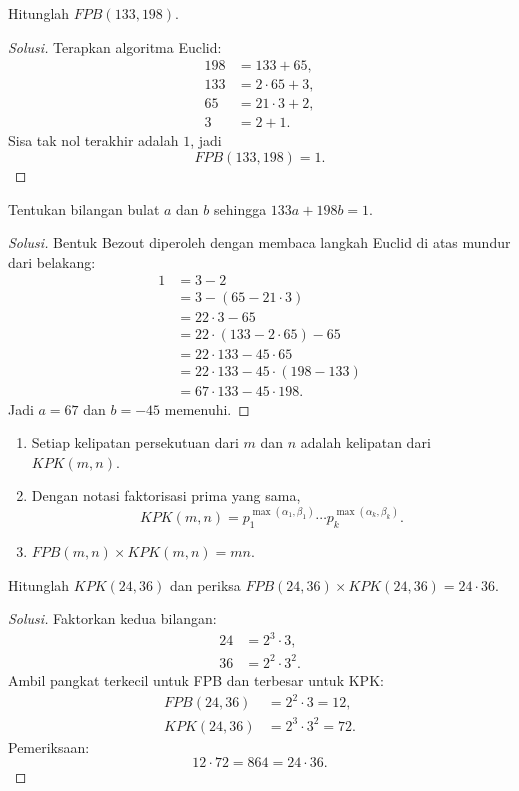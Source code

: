 \documentclass[12pt]{scrartcl}
\begin{document}
\begin{example}
Hitunglah $FPB(133, 198)$.
\end{example}
\begin{proof}[Solusi]
Terapkan algoritma Euclid:
\begin{align*}
198 &= 133 + 65, \\
133 &= 2 \cdot 65 + 3, \\
65 &= 21 \cdot 3 + 2, \\
3 &= 2 + 1.
\end{align*}
Sisa tak nol terakhir adalah $1$, jadi
\[ FPB(133, 198) = 1. \]
\end{proof}

\begin{example}
Tentukan bilangan bulat $a$ dan $b$ sehingga $133a + 198b = 1$.
\end{example}
\begin{proof}[Solusi]
Bentuk Bezout diperoleh dengan membaca langkah Euclid di atas mundur dari belakang:
\begin{align*}
1 &= 3 - 2 \\
&= 3 - (65 - 21 \cdot 3) \\
&= 22 \cdot 3 - 65 \\
&= 22 \cdot (133 - 2 \cdot 65) - 65 \\
&= 22 \cdot 133 - 45 \cdot 65 \\
&= 22 \cdot 133 - 45 \cdot (198 - 133) \\
&= 67 \cdot 133 - 45 \cdot 198.
\end{align*}
Jadi $a = 67$ dan $b = -45$ memenuhi.
\end{proof}

\begin{fact}
\begin{enumerate}
    \item Setiap kelipatan persekutuan dari $m$ dan $n$ adalah kelipatan dari $KPK(m, n)$.
    \item Dengan notasi faktorisasi prima yang sama,
    \[ KPK(m, n) = p_1^{\max(\alpha_1, \beta_1)} \cdots p_k^{\max(\alpha_k, \beta_k)}. \]
    \item $FPB(m, n) \times KPK(m, n) = mn$.
\end{enumerate}
\end{fact}

\begin{example}
Hitunglah $KPK(24, 36)$ dan periksa $FPB(24, 36) \times KPK(24, 36) = 24 \cdot 36$.
\end{example}
\begin{proof}[Solusi]
Faktorkan kedua bilangan:
\begin{align*}
24 &= 2^3 \cdot 3, \\
36 &= 2^2 \cdot 3^2.
\end{align*}
Ambil pangkat terkecil untuk FPB dan terbesar untuk KPK:
\begin{align*}
FPB(24, 36) &= 2^2 \cdot 3 = 12, \\
KPK(24, 36) &= 2^3 \cdot 3^2 = 72.
\end{align*}
Pemeriksaan:
\[ 12 \cdot 72 = 864 = 24 \cdot 36. \]
\end{proof}
\end{document}
